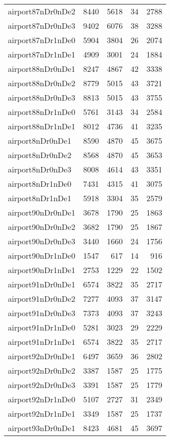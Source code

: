 \begin{longtable}{lrrrr}
airport87nDr0nDe2 & 8440 & 5618 & 34 & 2788 \\
airport87nDr0nDe3 & 9402 & 6076 & 38 & 3288 \\
airport87nDr1nDe0 & 5904 & 3804 & 26 & 2074 \\
airport87nDr1nDe1 & 4909 & 3001 & 24 & 1884 \\
airport88nDr0nDe1 & 8247 & 4867 & 42 & 3338 \\
airport88nDr0nDe2 & 8779 & 5015 & 43 & 3721 \\
airport88nDr0nDe3 & 8813 & 5015 & 43 & 3755 \\
airport88nDr1nDe0 & 5761 & 3143 & 34 & 2584 \\
airport88nDr1nDe1 & 8012 & 4736 & 41 & 3235 \\
airport8nDr0nDe1 & 8590 & 4870 & 45 & 3675 \\
airport8nDr0nDe2 & 8568 & 4870 & 45 & 3653 \\
airport8nDr0nDe3 & 8008 & 4614 & 43 & 3351 \\
airport8nDr1nDe0 & 7431 & 4315 & 41 & 3075 \\
airport8nDr1nDe1 & 5918 & 3304 & 35 & 2579 \\
airport90nDr0nDe1 & 3678 & 1790 & 25 & 1863 \\
airport90nDr0nDe2 & 3682 & 1790 & 25 & 1867 \\
airport90nDr0nDe3 & 3440 & 1660 & 24 & 1756 \\
airport90nDr1nDe0 & 1547 & 617 & 14 & 916 \\
airport90nDr1nDe1 & 2753 & 1229 & 22 & 1502 \\
airport91nDr0nDe1 & 6574 & 3822 & 35 & 2717 \\
airport91nDr0nDe2 & 7277 & 4093 & 37 & 3147 \\
airport91nDr0nDe3 & 7373 & 4093 & 37 & 3243 \\
airport91nDr1nDe0 & 5281 & 3023 & 29 & 2229 \\
airport91nDr1nDe1 & 6574 & 3822 & 35 & 2717 \\
airport92nDr0nDe1 & 6497 & 3659 & 36 & 2802 \\
airport92nDr0nDe2 & 3387 & 1587 & 25 & 1775 \\
airport92nDr0nDe3 & 3391 & 1587 & 25 & 1779 \\
airport92nDr1nDe0 & 5107 & 2727 & 31 & 2349 \\
airport92nDr1nDe1 & 3349 & 1587 & 25 & 1737 \\
airport93nDr0nDe1 & 8423 & 4681 & 45 & 3697 \\

\end{longtable}
